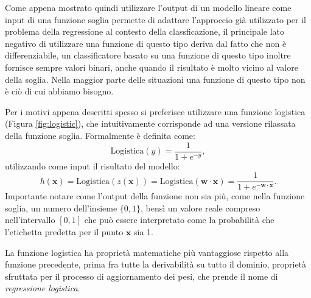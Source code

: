 \documentclass[../../main.tex]{subfiles}
\begin{document}
    Come appena mostrato quindi utilizzare l'output di un modello lineare come input di una funzione soglia permette di adattare l'approccio già utilizzato per il problema della regressione al contesto della classficazione, il principale lato negativo di utilizzare una funzione di questo tipo deriva dal fatto che non è differenziabile, un classificatore basato su una funzione di questo tipo inoltre fornisce sempre valori binari, anche quando il risultato è molto vicino al valore della soglia. Nella maggior parte delle situazioni una funzione di questo tipo non è ciò di cui abbiamo bisogno.

    Per i motivi appena descritti spesso si preferisce utilizzare una funzione logistica (Figura \ref{fig:logistic}), che intuitivamente corrisponde ad una versione rilassata della funzione soglia. Formalmente è definita come:
    \[ \text{Logistica}(y) = \frac{1}{1 + e^{-y}}, \]
    utilizzando come input il risultato del modello:
    \[h(\boldsymbol{x}) = \text{Logistica}(z(\boldsymbol{x})) = \text{Logistica}(\boldsymbol{w} \cdot \boldsymbol{x}) = \frac{1}{1 + e^{- \boldsymbol{w \cdot x}}} .\]
    Importante notare come l'output della funzione non sia più, come nella funzione soglia, un numero dell'insieme $\{0,1\}$, bensì un valore reale compreso nell'intervallo $[0, 1]$ che può essere interpretato come la probabilità che l'etichetta predetta per il punto $\boldsymbol{x}$ sia 1.

    La funzione logistica ha proprietà matematiche più vantaggiose rispetto alla funzione precedente, prima fra tutte la derivabilità su tutto il dominio, proprietà sfruttata per il processo di aggiornamento dei pesi, che prende il nome di \textit{regressione logistica}. 
    
\end{document}
